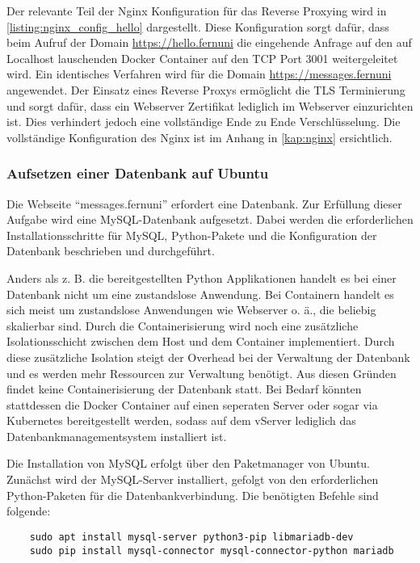 Der relevante Teil der Nginx Konfiguration für das Reverse Proxying wird in \autoref{listing:nginx_config_hello} dargestellt. Diese Konfiguration sorgt dafür, dass beim Aufruf der Domain \url{https://hello.fernuni} die eingehende Anfrage auf den auf Localhost lauschenden Docker Container auf den \ac{TCP} Port 3001 weitergeleitet wird. Ein identisches Verfahren wird für die Domain \url{https://messages.fernuni} angewendet. Der Einsatz eines Reverse Proxys ermöglicht die TLS Terminierung und sorgt dafür, dass ein Webserver Zertifikat lediglich im Webserver einzurichten ist. Dies verhindert jedoch eine vollständige Ende zu Ende Verschlüsselung. Die vollständige Konfiguration des Nginx ist im Anhang in \autoref{kap:nginx} ersichtlich.

\subsubsection{Aufsetzen einer Datenbank auf Ubuntu}

Die Webseite \enquote{messages.fernuni} erfordert eine Datenbank. Zur Erfüllung dieser Aufgabe wird eine MySQL-Datenbank aufgesetzt. Dabei werden die erforderlichen Installationsschritte für MySQL, Python-Pakete und die Konfiguration der Datenbank beschrieben und durchgeführt.

Anders als z. B. die bereitgestellten Python Applikationen handelt es bei einer Datenbank nicht um eine zustandslose Anwendung. Bei Containern handelt es sich meist um zustandslose Anwendungen wie Webserver o. ä., die beliebig skalierbar sind. Durch die Containerisierung wird noch eine zusätzliche Isolationsschicht zwischen dem Host und dem Container implementiert. Durch diese zusätzliche Isolation steigt der Overhead bei der Verwaltung der Datenbank und es werden mehr Ressourcen zur Verwaltung benötigt. Aus diesen Gründen findet keine Containerisierung der Datenbank statt. Bei Bedarf könnten stattdessen die Docker Container auf einen seperaten Server oder sogar via Kubernetes bereitgestellt werden, sodass auf dem vServer lediglich das Datenbankmanagementsystem installiert ist.

Die Installation von MySQL erfolgt über den Paketmanager von Ubuntu. Zunächst wird der MySQL-Server installiert, gefolgt von den erforderlichen Python-Paketen für die Datenbankverbindung. Die benötigten Befehle sind folgende:

\begin{verbatim}
    sudo apt install mysql-server python3-pip libmariadb-dev
    sudo pip install mysql-connector mysql-connector-python mariadb
\end{verbatim}

